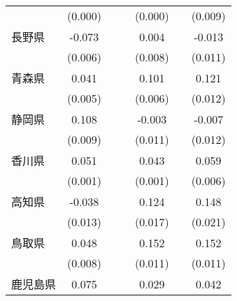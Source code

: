 \begin{table}[htbp]
\begin{tabular}{l*{6}{c}}
                    &     (0.000)         &                     &                     &     (0.000)         &                     &     (0.009)         \\
長野県              &      -0.073\sym{***}&                     &                     &       0.004         &                     &      -0.013         \\
                    &     (0.006)         &                     &                     &     (0.008)         &                     &     (0.011)         \\
青森県              &       0.041\sym{***}&                     &                     &       0.101\sym{***}&                     &       0.121\sym{***}\\
                    &     (0.005)         &                     &                     &     (0.006)         &                     &     (0.012)         \\
静岡県              &       0.108\sym{***}&                     &                     &      -0.003         &                     &      -0.007         \\
                    &     (0.009)         &                     &                     &     (0.011)         &                     &     (0.012)         \\
香川県              &       0.051\sym{***}&                     &                     &       0.043\sym{***}&                     &       0.059\sym{***}\\
                    &     (0.001)         &                     &                     &     (0.001)         &                     &     (0.006)         \\
高知県              &      -0.038\sym{**} &                     &                     &       0.124\sym{***}&                     &       0.148\sym{***}\\
                    &     (0.013)         &                     &                     &     (0.017)         &                     &     (0.021)         \\
鳥取県              &       0.048\sym{***}&                     &                     &       0.152\sym{***}&                     &       0.152\sym{***}\\
                    &     (0.008)         &                     &                     &     (0.011)         &                     &     (0.011)         \\
鹿児島県            &       0.075\sym{***}&                     &                     &       0.029\sym{***}&                     &       0.042\sym{***}\\

\end{tabular}
\end{table}
